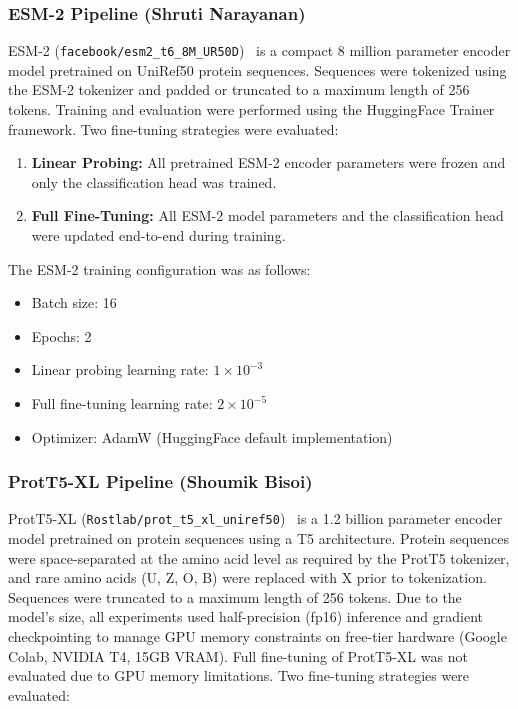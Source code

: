 \documentclass{article}
\begin{document}
\subsubsection*{ESM-2 Pipeline (Shruti Narayanan)}

ESM-2 (\texttt{facebook/esm2\_t6\_8M\_UR50D})~\cite{lin2023esm} is a compact 8 million parameter encoder model pretrained on UniRef50 protein sequences. Sequences were tokenized using the ESM-2 tokenizer and padded or truncated to a maximum length of 256 tokens. Training and evaluation were performed using the HuggingFace Trainer framework. Two fine-tuning strategies were evaluated:

\begin{enumerate}
    \item \textbf{Linear Probing:} All pretrained ESM-2 encoder parameters were frozen and only the classification head was trained.
    \item \textbf{Full Fine-Tuning:} All ESM-2 model parameters and the classification head were updated end-to-end during training.
\end{enumerate}

The ESM-2 training configuration was as follows:
\begin{itemize}
    \item Batch size: 16
    \item Epochs: 2
    \item Linear probing learning rate: $1 \times 10^{-3}$
    \item Full fine-tuning learning rate: $2 \times 10^{-5}$
    \item Optimizer: AdamW (HuggingFace default implementation)
\end{itemize}

\subsubsection*{ProtT5-XL Pipeline (Shoumik Bisoi)}

ProtT5-XL (\texttt{Rostlab/prot\_t5\_xl\_uniref50})~\cite{elnaggar2021prottrans} is a 1.2 billion parameter encoder model pretrained on protein sequences using a T5 architecture. Protein sequences were space-separated at the amino acid level as required by the ProtT5 tokenizer, and rare amino acids (U, Z, O, B) were replaced with X prior to tokenization. Sequences were truncated to a maximum length of 256 tokens. Due to the model's size, all experiments used half-precision (fp16) inference and gradient checkpointing to manage GPU memory constraints on free-tier hardware (Google Colab, NVIDIA T4, 15GB VRAM). Full fine-tuning of ProtT5-XL was not evaluated due to GPU memory limitations. Two fine-tuning strategies were evaluated:
\end{document}
